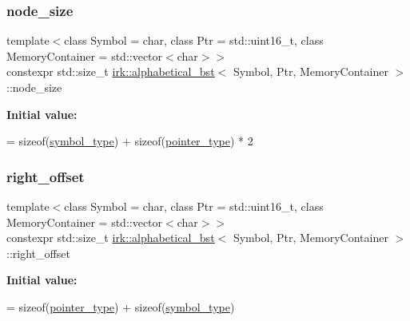 \subsubsection{\texorpdfstring{node\+\_\+size}{node\_size}}
{\footnotesize\ttfamily template$<$class Symbol = char, class Ptr = std\+::uint16\+\_\+t, class Memory\+Container = std\+::vector$<$char$>$$>$ \\
constexpr std\+::size\+\_\+t \mbox{\hyperlink{classirk_1_1alphabetical__bst}{irk\+::alphabetical\+\_\+bst}}$<$ Symbol, Ptr, Memory\+Container $>$\+::node\+\_\+size\hspace{0.3cm}{\ttfamily [static]}}

{\bfseries Initial value\+:}
\begin{DoxyCode}
=
        \textcolor{keyword}{sizeof}(\mbox{\hyperlink{classirk_1_1alphabetical__bst_a296ccb8fa9fa9dce3b3c3beab0a5ca28}{symbol\_type}}) + \textcolor{keyword}{sizeof}(\mbox{\hyperlink{classirk_1_1alphabetical__bst_ae689c05ab96a71769e24908d5c73765c}{pointer\_type}}) * 2
\end{DoxyCode}
\mbox{\label{classirk_1_1alphabetical__bst_ac354051aeafc78d341cc467d65c8c45a}} 
\subsubsection{\texorpdfstring{right\+\_\+offset}{right\_offset}}
{\footnotesize\ttfamily template$<$class Symbol = char, class Ptr = std\+::uint16\+\_\+t, class Memory\+Container = std\+::vector$<$char$>$$>$ \\
constexpr std\+::size\+\_\+t \mbox{\hyperlink{classirk_1_1alphabetical__bst}{irk\+::alphabetical\+\_\+bst}}$<$ Symbol, Ptr, Memory\+Container $>$\+::right\+\_\+offset\hspace{0.3cm}{\ttfamily [static]}}

{\bfseries Initial value\+:}
\begin{DoxyCode}
=
        \textcolor{keyword}{sizeof}(\mbox{\hyperlink{classirk_1_1alphabetical__bst_ae689c05ab96a71769e24908d5c73765c}{pointer\_type}}) + \textcolor{keyword}{sizeof}(\mbox{\hyperlink{classirk_1_1alphabetical__bst_a296ccb8fa9fa9dce3b3c3beab0a5ca28}{symbol\_type}})
\end{DoxyCode}
\mbox{\label{classirk_1_1alphabetical__bst_aab79d45f120c441ecfe435a15f060553}} 
